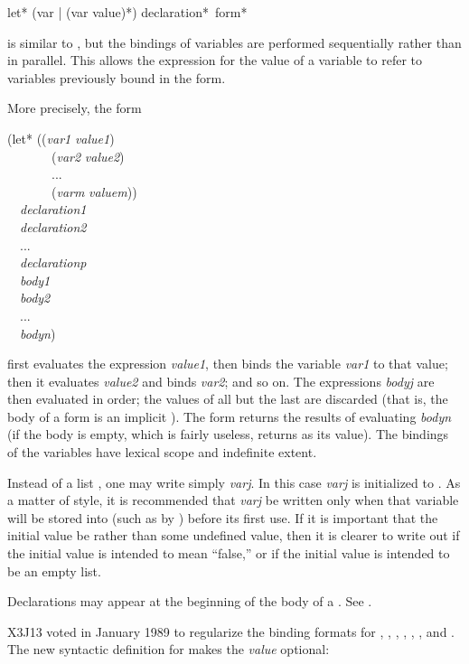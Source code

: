 \begin{defspec}
let* ({var | (var value)}*) {declaration}* {\,form}*

 is similar to , but the bindings of variables
are performed sequentially rather than in parallel.  This allows
the expression for the value of a variable to refer to variables
previously bound in the  form.

More precisely, the form
\begin{lisp}
(let* (({\it var1} {\it value1}) \\
~~~~~~~({\it var2} {\it value2}) \\
~~~~~~~... \\
~~~~~~~({\it varm} {\it valuem})) \\
~~{\it declaration1} \\
~~{\it declaration2} \\
~~... \\
~~{\it declarationp} \\
~~{\it body1} \\
~~{\it body2} \\
~~... \\
~~{\it bodyn})
\end{lisp}
first evaluates the expression {\it value1}, then binds the variable
{\it var1} to that value; then it evaluates {\it value2} and binds {\it var2};
and so on.
The expressions {\it bodyj} are then evaluated
in order; the values of all but the last are discarded
(that is, the body of a  form is an implicit ).
The  form returns the results of evaluating {\it bodyn} (if the
body is empty, which is fairly useless,  returns {\false} as its value).
The bindings of the variables have lexical scope and indefinite extent.

Instead of a list , one may write simply {\it varj}.
In this case {\it varj} is initialized to {\false}.  As a matter of style,
it is recommended that {\it varj} be written only when that variable
will be stored into (such as by ) before its first use.
If it is important that the initial value be {\nil} rather than
some undefined value, then it is clearer to write out
 if the initial value is intended to mean ``false,'' or
 if the initial value is intended to be an empty
list.

Declarations may appear at the beginning of the body of a .
See .

\begin{new}
X3J13 voted in January 1989
to regularize the binding formats for , , ,
, , , and .
The new syntactic definition for  makes the {\it value} optional:


\end{new}
\end{defspec}
